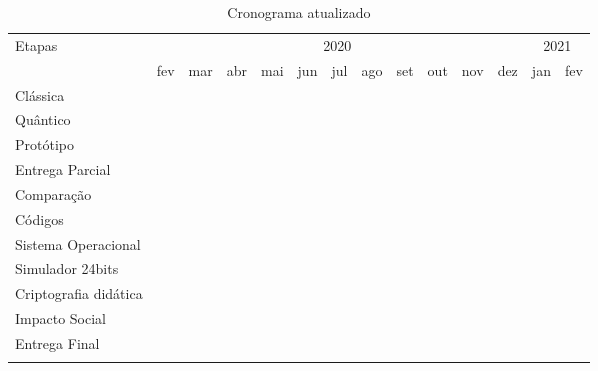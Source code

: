 \vspace{1cm}
\begin{longtable}{ |p{2.5cm}||p{0.60cm}|p{0.60cm}|p{0.60cm}|p{0.60cm}|p{0.60cm}|p{0.60cm}|p{0.60cm}|p{0.60cm}|p{0.60cm}|p{0.60cm}|p{0.60cm}|p{0.60cm}|p{0.60cm}|  }
  \hline
  \multirow{2}{*}{Etapas} & 
  \multicolumn{11}{|c|}{2020} & 
  \multicolumn{2}{|c|}{2021} \\
        &
    fev &
    mar &
    abr &
    mai &
    jun &
    jul &
    ago &
    set &
    out &
    nov &
    dez &
    jan &
    fev \\
  \hline
  Clássica & &
  \multicolumn{6}{|c|}{\cellcolor{green!25}} & 
  & & & & & \\
  \hline
  Quântico & &
  \multicolumn{1}{|c|}{\cellcolor{green!25}} & 
  & & & &
  \multicolumn{2}{|c|}{\cellcolor{green!25}} & 
  \multicolumn{4}{|c|}{\cellcolor{blue!25}} & 
  \\
  \hline
  Protótipo & & & & &
  \multicolumn{1}{|c|}{\cellcolor{green!25}} & 
  & & & & & & & \\
  \hline
  Entrega Parcial & & & &
  \multicolumn{5}{|c|}{\cellcolor{green!25}} & 
  & & & & \\
  \hline
  Comparação & & & & & & & & & &
  \multicolumn{2}{|c|}{\cellcolor{blue!25}} & 
  & \\
  \hline
  Códigos & &
  \multicolumn{7}{|c|}{\cellcolor{green!25}} & 
  \multicolumn{4}{|c|}{\cellcolor{blue!25}} & 
  \\
  \hline
  Sistema Operacional & & &
  \multicolumn{5}{|c|}{\cellcolor{green!25}} & 
  & & & & & 
  \\
  \hline
  Simulador 24bits & & &
  \multicolumn{5}{|c|}{\cellcolor{green!25}} & 
  & & & & & 
  \\
  \hline
  Criptografia didática & & & & &
  \multicolumn{2}{|c|}{\cellcolor{green!25}} & 
  & & 
  \multicolumn{3}{|c|}{\cellcolor{blue!25}} & 
  &
  \\
  \hline
  Impacto Social & & & & & &
  \multicolumn{2}{|c|}{\cellcolor{green!25}} & 
  & &
  \multicolumn{2}{|c|}{\cellcolor{blue!25}} & 
  & \\
  \hline
  Entrega Final & & & & & & &
  \multicolumn{2}{|c|}{\cellcolor{green!25}} & 
  \multicolumn{5}{|c|}{\cellcolor{blue!25}} \\
  \hline
  \caption{Cronograma atualizado}
  \label{updated_timeline}
\end{longtable}
\vspace{1cm}

